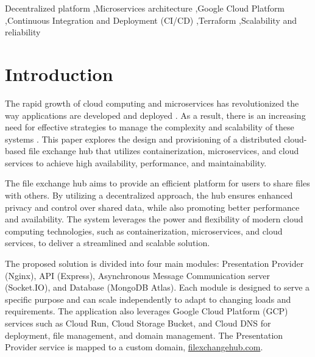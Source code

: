 \documentclass[a4paper,fleqn]{cas-dc}
\begin{document}
\begin{keywords}
Decentralized platform \sep Microservices architecture \sep Google Cloud Platform \sep Continuous Integration and Deployment (CI/CD) \sep Terraform \sep Scalability and reliability
\end{keywords}


\maketitle

\section{Introduction}

The rapid growth of cloud computing and microservices has revolutionized the way applications are developed and deployed \cite{Selvakumar2023}. As a result, there is an increasing need for effective strategies to manage the complexity and scalability of these systems \cite{Correia2018}. This paper explores the design and provisioning of a distributed cloud-based file exchange hub that utilizes containerization, microservices, and cloud services to achieve high availability, performance, and maintainability.

The file exchange hub aims to provide an efficient platform for users to share files with others. By utilizing a decentralized approach, the hub ensures enhanced privacy and control over shared data, while also promoting better performance and availability. The system leverages the power and flexibility of modern cloud computing technologies, such as containerization, microservices, and cloud services, to deliver a streamlined and scalable solution.

The proposed solution is divided into four main modules: Presentation Provider (Nginx), API (Express), Asynchronous Message Communication server (Socket.IO), and Database (MongoDB Atlas). Each module is designed to serve a specific purpose and can scale independently to adapt to changing loads and requirements. The application also leverages Google Cloud Platform (GCP) services such as Cloud Run, Cloud Storage Bucket, and Cloud DNS for deployment, file management, and domain management. The Presentation Provider service is mapped to a custom domain, \url{filexchangehub.com}.
\end{document}
